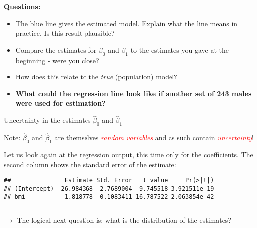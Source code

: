\documentclass[10pt,ignorenonframetext,]{beamer}
\newenvironment{Shaded}{\begin{snugshade}}{\end{snugshade}}
\newcommand{\KeywordTok}[1]{\textcolor[rgb]{0.13,0.29,0.53}{\textbf{#1}}}
\newcommand{\NormalTok}[1]{#1}
\newcommand{\OperatorTok}[1]{\textcolor[rgb]{0.81,0.36,0.00}{\textbf{#1}}}
\begin{document}
\begin{frame}

\textbf{Questions:}

\begin{itemize}
\item
  The blue line gives the estimated model. Explain what the line means
  in practice. Is this result plausible?
\item
  Compare the estimates for \(\beta_0\) and \(\beta_1\) to the estimates
  you gave at the beginning - were you close?
\item
  How does this relate to the \emph{true} (population) model?
\item
  \textbf{What could the regression line look like if another set of 243
  males were used for estimation?}
\end{itemize}

\end{frame}

\begin{frame}[fragile]

\begin{block}{Uncertainty in the estimates \(\hat\beta_0\) and
\(\hat\beta_1\)}

\vspace{2mm}

Note: \(\hat\beta_0\) and \(\hat\beta_1\) are themselves
\emph{\textcolor{red}{random variables}} and as such contain
\emph{\textcolor{red}{uncertainty}}!

\vspace{4mm}

Let us look again at the regression output, this time only for the
coefficients. The second column shows the standard error of the
estimate: \vspace{2mm}

\scriptsize

\begin{Shaded}
\end{Shaded}

\begin{verbatim}
##               Estimate Std. Error   t value     Pr(>|t|)
## (Intercept) -26.984368  2.7689004 -9.745518 3.921511e-19
## bmi           1.818778  0.1083411 16.787522 2.063854e-42
\end{verbatim}

\normalsize

\(~\)

\(\rightarrow\) The logical next question is: what is the distribution
of the estimates?

\end{block}

\end{frame}
\end{document}

